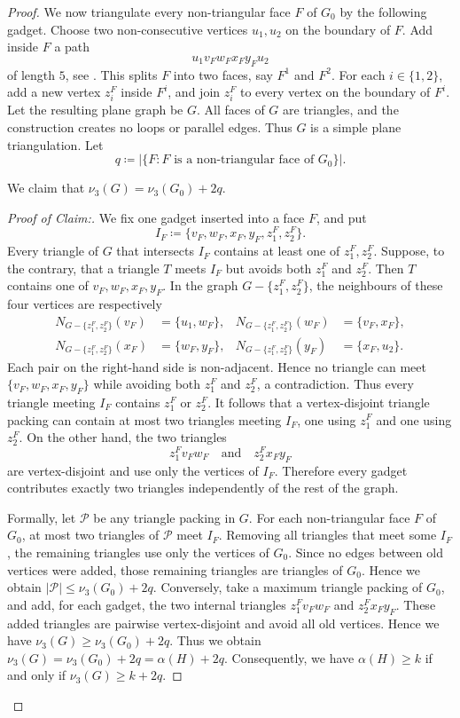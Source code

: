 \documentclass{patmorin}
\newenvironment{clmproof}{\begin{proof}[Proof of Claim:]\renewcommand{\qedsymbol}{\rule{1ex}{1ex}}}{\end{proof}}
\begin{document}
\begin{proof}
We now triangulate every non-triangular face $F$ of $G_0$ by the following gadget.  
Choose two non-consecutive vertices $u_1,u_2$ on the boundary of $F$.  
Add inside $F$ a path
\[
        u_1 v_F w_F x_F y_F u_2
\]
of length $5$, see .
This splits $F$ into two faces, say $F^1$ and $F^2$.
For each $i \in \{1,2\}$, add a new vertex $z_i^F$ inside $F^i$, and join $z_i^F$ to every vertex on the boundary of $F^i$.  
Let the resulting plane graph be $G$.
All faces of $G$ are triangles, and the construction creates no loops or parallel edges.  
Thus $G$ is a simple plane triangulation.  
Let
\[
        q \coloneqq |\{F : F \text{ is a non-triangular face of } G_0\}|.
\]
\begin{clm}
We claim that $\nu_3(G) = \nu_3(G_0) + 2q$.
\end{clm}
\begin{clmproof}
We fix one gadget inserted into a face $F$, and put
\[
        I_F \coloneqq \{v_F,w_F,x_F,y_F,z_1^F,z_2^F\}.
\]
Every triangle of $G$ that intersects $I_F$ contains at least one of
$z_1^F,z_2^F$.  Suppose, to the contrary, that a triangle $T$ meets
$I_F$ but avoids both $z_1^F$ and $z_2^F$.  Then $T$ contains one of
$v_F,w_F,x_F,y_F$.  In the graph $G-\{z_1^F,z_2^F\}$, the neighbours
of these four vertices are respectively
\[
\begin{aligned}
N_{G-\{z_1^F,z_2^F\}}(v_F) &= \{u_1,w_F\},&
N_{G-\{z_1^F,z_2^F\}}(w_F) &= \{v_F,x_F\},\\
N_{G-\{z_1^F,z_2^F\}}(x_F) &= \{w_F,y_F\},&
N_{G-\{z_1^F,z_2^F\}}(y_F) &= \{x_F,u_2\}.
\end{aligned}
\]
Each pair on the right-hand side is non-adjacent.  Hence no triangle
can meet $\{v_F,w_F,x_F,y_F\}$ while avoiding both $z_1^F$ and $z_2^F$, a contradiction.  Thus every triangle meeting $I_F$ contains $z_1^F$ or $z_2^F$.
It follows that a vertex-disjoint triangle packing can contain at most
two triangles meeting $I_F$, one using $z_1^F$ and one using $z_2^F$.
On the other hand, the two triangles
\[
        z_1^F v_F w_F
        \quad\text{and}\quad
        z_2^F x_F y_F
\]
are vertex-disjoint and use only the vertices of $I_F$.  Therefore every
gadget contributes exactly two triangles independently of the rest of
the graph.

Formally, let $\mathcal{P}$ be any triangle packing in $G$.  For each
non-triangular face $F$ of $G_0$, at most two triangles of
$\mathcal{P}$ meet $I_F$.  Removing all triangles that meet some
$I_F$, the remaining triangles use only the vertices of $G_0$.  Since no
edges between old vertices were added, those remaining triangles are
triangles of $G_0$.  
Hence we obtain  $|\mathcal{P}| \le \nu_3(G_0) + 2q$.
Conversely, take a maximum triangle packing of $G_0$, and add, for each gadget, the two internal triangles $z_1^F v_F w_F$ and $z_2^F x_F y_F$.
These added triangles are pairwise vertex-disjoint and avoid all old vertices.  Hence we have $\nu_3(G) \ge \nu_3(G_0) + 2q$.
Thus we obtain $\nu_3(G) = \nu_3(G_0) + 2q = \alpha(H) + 2q$.
Consequently, we have $\alpha(H) \ge k$ if and only if $\nu_3(G) \ge k + 2q$. 
\end{clmproof}


\end{proof}
\end{document}
